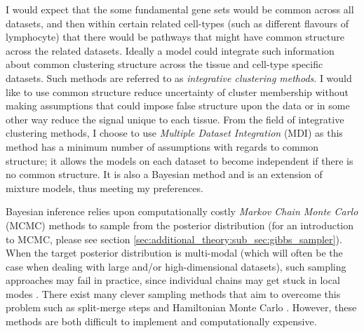 \documentclass[14pt]{extarticle} %
\begin{document}
	I would expect that the some fundamental gene sets would be common across all datasets, and then within certain related cell-types (such as different flavours of lymphocyte) that there would be pathways that might have common structure across the related datasets. Ideally a model could integrate such information about common clustering structure across the tissue and cell-type specific datasets. Such methods are referred to as \emph{integrative clustering methods}. I would like to use common structure reduce uncertainty of cluster membership without making assumptions that could impose false structure upon the data or in some other way reduce the signal unique to each tissue. From the field of integrative clustering methods, I choose to use \emph{Multiple Dataset Integration} (MDI) \citep{KirkBayesiancorrelatedclustering2012} as this method has a minimum number of assumptions with regards to common structure; it allows the models on each dataset to become independent if there is no common structure. It is also a Bayesian method and is an extension of mixture models, thus meeting my preferences.
	
	Bayesian inference relies upon computationally costly \emph{Markov Chain Monte Carlo} (MCMC) methods to sample from the posterior distribution (for an introduction to MCMC, please see section \ref{sec:additional_theory:sub_sec:gibbs_sampler}). When the target posterior distribution is multi-modal (which will often be the case when dealing with large and/or high-dimensional datasets), such sampling approaches may fail in practice, since individual chains may get stuck in local modes \citep{TjelmelandModeJumpingProposals2001}. There exist many clever sampling methods that aim to overcome this problem such as split-merge steps \citep{dahl_sequentially-allocated_2005} and Hamiltonian Monte Carlo \citep{duane1987hybrid, hoffman2014no}. However, these methods are both difficult to implement and computationally expensive.
	
	
\end{document}
